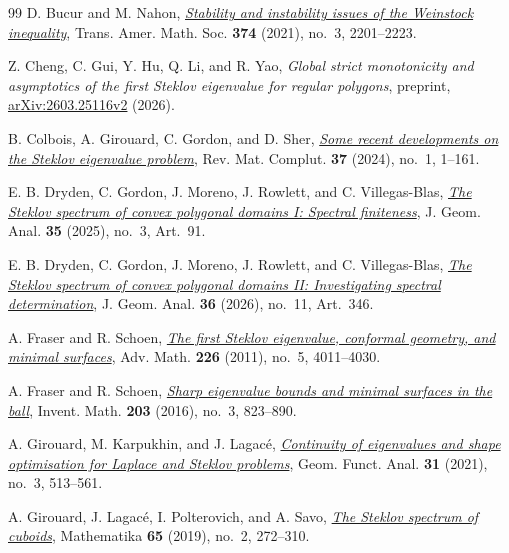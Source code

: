 \documentclass[11pt]{amsart}
\theoremstyle{remark}\newtheorem{remark}[theorem]{Remark}
\numberwithin{equation}{section}
\begin{document}
\begin{thebibliography}{99}
D. Bucur and M. Nahon,
\href{https://doi.org/10.1090/tran/8302}{\emph{Stability and instability issues of the Weinstock inequality}},
Trans. Amer. Math. Soc. \textbf{374} (2021), no.~3, 2201--2223.

Z. Cheng, C. Gui, Y. Hu, Q. Li, and R. Yao,
\emph{Global strict monotonicity and asymptotics of the first Steklov eigenvalue for regular polygons}, preprint,
\href{https://arxiv.org/abs/2603.25116v2}{arXiv:2603.25116v2} (2026).

B. Colbois, A. Girouard, C. Gordon, and D. Sher,
\href{https://doi.org/10.1007/s13163-023-00480-3}{\emph{Some recent developments on the Steklov eigenvalue problem}},
Rev. Mat. Complut. \textbf{37} (2024), no.~1, 1--161.

E. B. Dryden, C. Gordon, J. Moreno, J. Rowlett, and C. Villegas-Blas,
\href{https://doi.org/10.1007/s12220-025-01922-8}{\emph{The Steklov spectrum of convex polygonal domains I: Spectral finiteness}},
J. Geom. Anal. \textbf{35} (2025), no.~3, Art.~91.

E. B. Dryden, C. Gordon, J. Moreno, J. Rowlett, and C. Villegas-Blas,
\href{https://doi.org/10.1007/s12220-026-02597-5}{\emph{The Steklov spectrum of convex polygonal domains II: Investigating spectral determination}},
J. Geom. Anal. \textbf{36} (2026), no.~11, Art.~346.

A. Fraser and R. Schoen,
\href{https://doi.org/10.1016/j.aim.2010.11.007}{\emph{The first Steklov eigenvalue, conformal geometry, and minimal surfaces}},
Adv. Math. \textbf{226} (2011), no.~5, 4011--4030.

A. Fraser and R. Schoen,
\href{https://doi.org/10.1007/s00222-015-0604-x}{\emph{Sharp eigenvalue bounds and minimal surfaces in the ball}},
Invent. Math. \textbf{203} (2016), no.~3, 823--890.

A. Girouard, M. Karpukhin, and J. Lagac\'e,
\href{https://doi.org/10.1007/s00039-021-00573-5}{\emph{Continuity of eigenvalues and shape optimisation for Laplace and Steklov problems}},
Geom. Funct. Anal. \textbf{31} (2021), no.~3, 513--561.

A. Girouard, J. Lagac\'e, I. Polterovich, and A. Savo,
\href{https://doi.org/10.1112/S0025579318000414}{\emph{The Steklov spectrum of cuboids}},
Mathematika \textbf{65} (2019), no.~2, 272--310.


\end{thebibliography}
\end{document}
